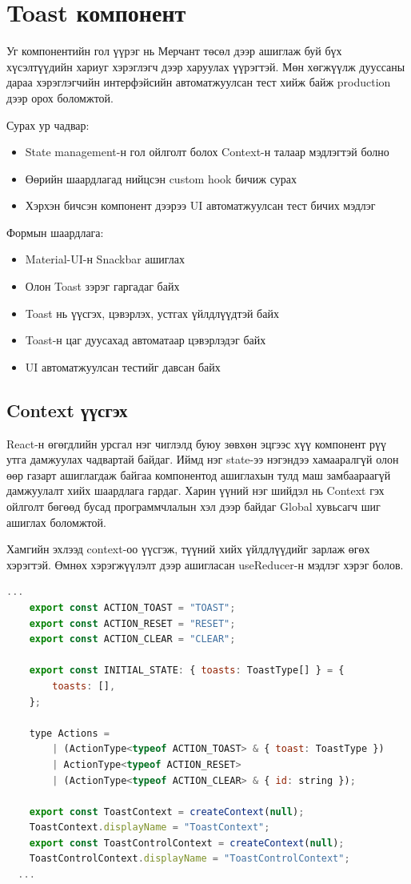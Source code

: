 \section{Toast компонент}

Уг компонентийн гол үүрэг нь Мерчант төсөл дээр ашиглаж буй бүх хүсэлтүүдийн хариуг хэрэглэгч дээр харуулах үүрэгтэй. Мөн хөгжүүлж дууссаны дараа хэрэглэгчийн интерфэйсийн автоматжуулсан тест хийж байж production дээр орох боломжтой.

Сурах ур чадвар: 
\begin{itemize}
    \item State management-н гол ойлголт болох Context-н талаар мэдлэгтэй болно
    \item Өөрийн шаардлагад нийцсэн custom hook бичиж сурах
    \item Хэрхэн бичсэн компонент дээрээ UI автоматжуулсан тест бичих мэдлэг
\end{itemize}

Формын шаардлага: 
\begin{itemize}
    \item Material-UI-н Snackbar ашиглах
    \item Олон Toast зэрэг гаргадаг байх
    \item Toast нь үүсгэх, цэвэрлэх, устгах үйлдлүүдтэй байх
    \item Toast-н цаг дуусахад автоматаар цэвэрлэдэг байх
    \item UI автоматжуулсан тестийг давсан байх
\end{itemize}

\subsection{Context үүсгэх}

React-н өгөгдлийн урсгал нэг чиглэлд буюу зөвхөн эцгээс хүү компонент рүү утга дамжуулах чадвартай байдаг. Иймд нэг state-ээ нэгэндээ хамааралгүй олон өөр газарт ашиглагдаж байгаа компонентод ашиглахын тулд маш замбаараагүй дамжуулалт хийх шаардлага гардаг. Харин үүний нэг шийдэл нь Context гэх ойлголт бөгөөд бусад программчлалын хэл дээр байдаг Global хувьсагч шиг ашиглах боломжтой. 

Хамгийн эхлээд context-оо үүсгэж, түүний хийх үйлдлүүдийг зарлаж өгөх хэрэгтэй. Өмнөх хэрэгжүүлэлт дээр ашигласан useReducer-н мэдлэг хэрэг болов.

\begin{lstlisting}[language=Javascript, caption=Context үүсгэх, frame=single]
	...  
	export const ACTION_TOAST = "TOAST";
	export const ACTION_RESET = "RESET";
	export const ACTION_CLEAR = "CLEAR";

	export const INITIAL_STATE: { toasts: ToastType[] } = {
		toasts: [],
	};

	type Actions =
		| (ActionType<typeof ACTION_TOAST> & { toast: ToastType })
		| ActionType<typeof ACTION_RESET>
		| (ActionType<typeof ACTION_CLEAR> & { id: string });

	export const ToastContext = createContext(null);
	ToastContext.displayName = "ToastContext";
	export const ToastControlContext = createContext(null);
	ToastControlContext.displayName = "ToastControlContext";
  ...
\end{lstlisting}

